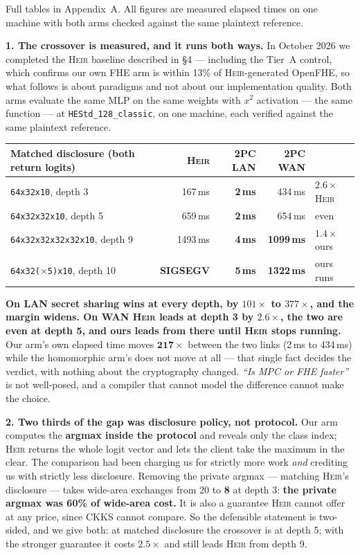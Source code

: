 \documentclass[10pt]{article}
\newcommand{\heir}{\textsc{Heir}}
\begin{document}
Full tables in Appendix~A. All figures are measured elapsed times on one machine
with both arms checked against the same plaintext reference.

\medskip
\noindent\textbf{1. The crossover is measured, and it runs both ways.} In
October 2026 we completed the \heir{} baseline described in §4 --- including the
Tier~A control, which confirms our own FHE arm is within 13\% of
\heir{}-generated OpenFHE, so what follows is about paradigms and not about our
implementation quality. Both arms evaluate the same MLP on the
same weights with $x^2$ activation --- the same function --- at
\texttt{HEStd\_128\_classic}, on one machine, each verified against the same
plaintext reference.

\begin{center}\small
\begin{tabular}{@{}lrrrl@{}}
\toprule
Matched disclosure (both return logits) & \textbf{\heir{}} & \textbf{2PC LAN} & \textbf{2PC WAN} & \\
\midrule
\texttt{64x32x10}, depth 3 & 167\,ms & \textbf{2\,ms} & 434\,ms & $2.6\times$ \heir{} \\
\texttt{64x32x32x10}, depth 5 & 659\,ms & \textbf{2\,ms} & 654\,ms & even \\
\texttt{64x32x32x32x32x10}, depth 9 & 1493\,ms & \textbf{4\,ms} & \textbf{1099\,ms} & $1.4\times$ ours \\
\texttt{64x32($\times$5)x10}, depth 10 & \textbf{SIGSEGV} & \textbf{5\,ms} & \textbf{1322\,ms} & ours runs \\
\bottomrule
\end{tabular}
\end{center}

\noindent\textbf{On LAN secret sharing wins at every depth, by $101\times$ to
$377\times$, and the margin widens. On WAN \heir{} leads at depth 3 by
$2.6\times$, the two are even at depth 5, and ours leads from there until \heir{}
stops running.} Our arm's own elapsed time moves $\mathbf{217\times}$ between
the two links (2\,ms to 434\,ms) while the homomorphic arm's does not move at
all --- that single fact decides the verdict, with nothing about the
cryptography changed. \emph{``Is MPC or FHE faster''} is not well-posed, and a
compiler that cannot model the difference cannot make the choice.

\medskip
\noindent\textbf{2. Two thirds of the gap was disclosure policy, not protocol.}
Our arm computes the \textbf{argmax inside the protocol} and reveals only the
class index; \heir{} returns the whole logit vector and lets the client take the
maximum in the clear. The comparison had been charging us for strictly more work
\emph{and} crediting us with strictly less disclosure. Removing the private
argmax --- matching \heir{}'s disclosure --- takes wide-area exchanges from 20 to
\textbf{8} at depth 3: \textbf{the private argmax was 60\% of wide-area cost.}
It is also a guarantee \heir{} cannot offer at any price, since CKKS cannot
compare. So the defensible statement is two-sided, and we give both: at matched
disclosure the crossover is at depth 5; with the stronger guarantee it costs
$2.5\times$ and still leads \heir{} from depth 9.
\end{document}
